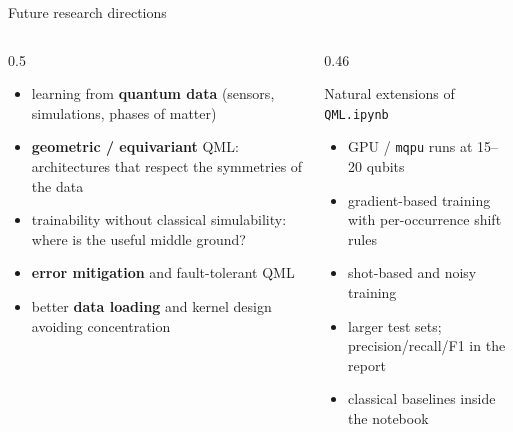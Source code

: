 \documentclass[aspectratio=169,11pt]{beamer}
\newcommand{\key}[1]{{\color{qdark}\textbf{#1}}}
\begin{document}
\begin{frame}[label=fFuture]{Future research directions}
  \begin{columns}[T]
    \begin{column}{0.5\textwidth}
      \small
      \begin{itemize}\itemsep2pt
        \item learning from \key{quantum data} (sensors, simulations, phases of matter)
        \item \key{geometric / equivariant} QML: architectures that respect the symmetries of the data
        \item trainability without classical simulability: where is the useful middle ground?
        \item \key{error mitigation} and fault-tolerant QML
        \item better \key{data loading} and kernel design avoiding concentration
      \end{itemize}
    \end{column}
    \begin{column}{0.46\textwidth}
      \begin{block}{Natural extensions of \texttt{QML.ipynb}}
        \scriptsize
        \begin{itemize}\itemsep1pt
          \item GPU / \texttt{mqpu} runs at 15--20 qubits
          \item gradient-based training with per-occurrence shift rules
          \item shot-based and noisy training
          \item larger test sets; precision/recall/F1 in the report
          \item classical baselines inside the notebook
        \end{itemize}
      \end{block}
    \end{column}
  \end{columns}
\end{frame}
\end{document}
